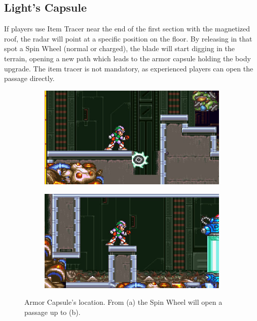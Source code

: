 \subsection{Light's Capsule}\label{X2:Body_parts}
If players use Item Tracer near the end of the first section with the magnetized roof, the radar will point at a specific position on the floor. By releasing in that spot a Spin Wheel (normal or charged), the blade will start digging in the terrain, opening a new path which leads to the armor capsule holding the body upgrade. The item tracer is not mandatory, as experienced players can open the passage directly.
\begin{figure}[htp]
	\centering
	\begin{subfigure}{0.4\linewidth}
		\centering
		\includegraphics[width=\linewidth]{figures/X2/Morph_moth/Moth_capsule_1.jpg}	
		\caption{}
	\end{subfigure}
	\begin{subfigure}{0.4\linewidth}
		\centering
		\includegraphics[width=\linewidth]{figures/X2/Morph_moth/Moth_capsule_2.jpg}
		\caption{}	
	\end{subfigure}
	\caption{Armor Capsule's location. From (a) the Spin Wheel will open a passage up to (b).}
\end{figure}

